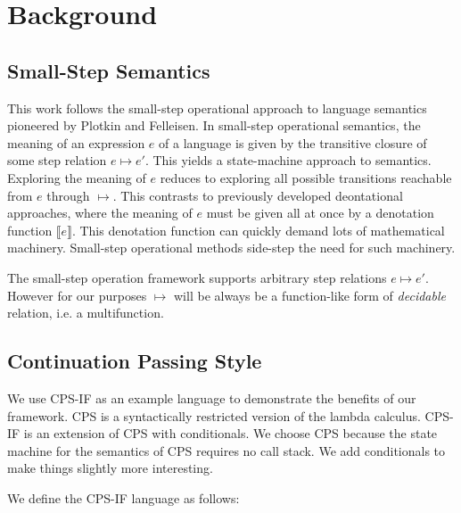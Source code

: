 \documentclass{article}
\begin{document}
\section{Background}
\label{section:Background}
 
\subsection{Small-Step Semantics}
\label{section:Background:SmallStepSemantics}

This work follows the small-step operational approach to language semantics pioneered by Plotkin and Felleisen.
In small-step operational semantics, the meaning of an expression $e$ of a language is given by the transitive closure of some step relation $e ↦ e'$.
This yields a state-machine approach to semantics.
Exploring the meaning of $e$ reduces to exploring all possible transitions reachable from $e$ through $↦$.
This contrasts to previously developed deontational approaches, where the meaning of $e$ must be given all at once by a denotation function $⟦ e ⟧$.
This denotation function can quickly demand lots of mathematical machinery.
Small-step operational methods side-step the need for such machinery.

The small-step operation framework supports arbitrary step relations $e ↦ e'$.  
However for our purposes $↦$ will be always be a function-like form of \emph{decidable} relation, i.e. a multifunction.


\subsection{Continuation Passing Style}
\label{section:Background:ContinuationPassingStyle}

We use CPS-IF as an example language to demonstrate the benefits of our framework.
CPS is a syntactically restricted version of the lambda calculus.
CPS-IF is an extension of CPS with conditionals.
We choose CPS because the state machine for the semantics of CPS requires no call stack.
We add conditionals to make things slightly more interesting.

We define the CPS-IF language as follows:

\end{document}
